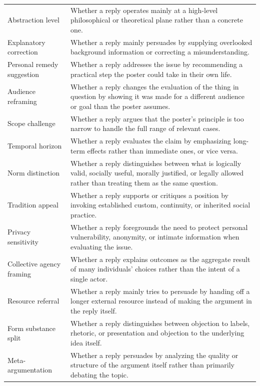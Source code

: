 \begin{tabularx}{\textwidth}{@{}>{\raggedright\arraybackslash}p{} X@{}}
Abstraction level & Whether a reply operates mainly at a high-level philosophical or theoretical plane rather than a concrete one. \\
Explanatory correction & Whether a reply mainly persuades by supplying overlooked background information or correcting a misunderstanding. \\
Personal remedy suggestion & Whether a reply addresses the issue by recommending a practical step the poster could take in their own life. \\
Audience reframing & Whether a reply changes the evaluation of the thing in question by showing it was made for a different audience or goal than the poster assumes. \\
Scope challenge & Whether a reply argues that the poster's principle is too narrow to handle the full range of relevant cases. \\
Temporal horizon & Whether a reply evaluates the claim by emphasizing long-term effects rather than immediate ones, or vice versa. \\
Norm distinction & Whether a reply distinguishes between what is logically valid, socially useful, morally justified, or legally allowed rather than treating them as the same question. \\
Tradition appeal & Whether a reply supports or critiques a position by invoking established custom, continuity, or inherited social practice. \\
Privacy sensitivity & Whether a reply foregrounds the need to protect personal vulnerability, anonymity, or intimate information when evaluating the issue. \\
Collective agency framing & Whether a reply explains outcomes as the aggregate result of many individuals' choices rather than the intent of a single actor. \\
Resource referral & Whether a reply mainly tries to persuade by handing off a longer external resource instead of making the argument in the reply itself. \\
Form substance split & Whether a reply distinguishes between objection to labels, rhetoric, or presentation and objection to the underlying idea itself. \\
Meta-argumentation & Whether a reply persuades by analyzing the quality or structure of the argument itself rather than primarily debating the topic. \\
\bottomrule
\end{tabularx}
